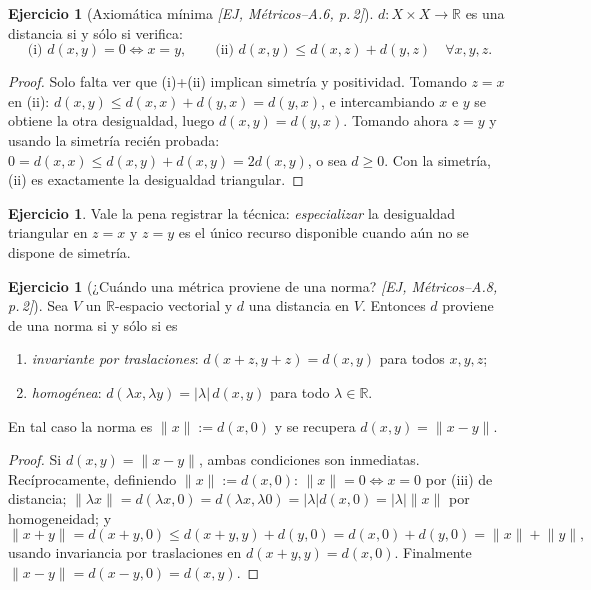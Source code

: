 \documentclass[11pt,a4paper]{article}
\theoremstyle{definition}
\newtheorem{ejercicio}[definicion]{Ejercicio}
\theoremstyle{plain}
\newcommand{\fnt}[1]{{\normalfont\small\itshape\color{gray!150!black}[#1]}}
\newcommand{\R}{\mathbb{R}}
\newcommand{\norm}[1]{\lVert #1 \rVert}
\begin{document}
\begin{ejercicio}[Axiomática mínima \fnt{EJ, Métricos--A.6, p.\,2}]
$d:X\times X\to\R$ es una distancia si y sólo si verifica:
\[
\text{(i) } d(x,y)=0\iff x=y, \qquad
\text{(ii) } d(x,y)\le d(x,z)+d(y,z)\quad \forall x,y,z .
\]
\end{ejercicio}

\begin{proof}
Solo falta ver que (i)+(ii) implican simetría y positividad. Tomando $z=x$ en (ii): $d(x,y)\le d(x,x)+d(y,x)=d(y,x)$, e intercambiando $x$ e $y$ se obtiene la otra desigualdad, luego $d(x,y)=d(y,x)$. Tomando ahora $z=y$ y usando la simetría recién probada: $0=d(x,x)\le d(x,y)+d(x,y)=2d(x,y)$, o sea $d\ge 0$. Con la simetría, (ii) es exactamente la desigualdad triangular.
\end{proof}

\begin{ejercicio}
Vale la pena registrar la técnica: \emph{especializar} la desigualdad triangular en $z=x$ y $z=y$ es el único recurso disponible cuando aún no se dispone de simetría.
\end{ejercicio}

\begin{ejercicio}[¿Cuándo una métrica proviene de una norma? \fnt{EJ, Métricos--A.8, p.\,2}]
Sea $V$ un $\R$-espacio vectorial y $d$ una distancia en $V$. Entonces $d$ proviene de una norma si y sólo si es
\begin{enumerate}[label=(\roman*),leftmargin=2.2em,itemsep=0pt]
\item \emph{invariante por traslaciones}: $d(x+z,y+z)=d(x,y)$ para todos $x,y,z$;
\item \emph{homogénea}: $d(\lambda x,\lambda y)=|\lambda|\,d(x,y)$ para todo $\lambda\in\R$.
\end{enumerate}
En tal caso la norma es $\norm{x}:=d(x,0)$ y se recupera $d(x,y)=\norm{x-y}$.
\end{ejercicio}

\begin{proof}
Si $d(x,y)=\norm{x-y}$, ambas condiciones son inmediatas. Recíprocamente, definiendo $\norm{x}:=d(x,0)$: $\norm{x}=0\iff x=0$ por (iii) de distancia; $\norm{\lambda x}=d(\lambda x,0)=d(\lambda x,\lambda 0)=|\lambda| d(x,0)=|\lambda|\norm{x}$ por homogeneidad; y
\[
\norm{x+y}=d(x+y,0)\le d(x+y,y)+d(y,0)=d(x,0)+d(y,0)=\norm{x}+\norm{y},
\]
usando invariancia por traslaciones en $d(x+y,y)=d(x,0)$. Finalmente $\norm{x-y}=d(x-y,0)=d(x,y)$.
\end{proof}
\end{document}
